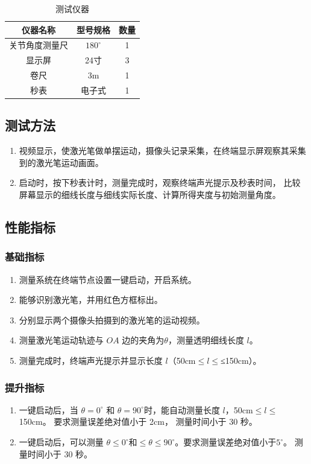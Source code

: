 \documentclass[scheme=chinese,a4paper]{article}
\begin{document}
\begin{table}[H]
  \centering
  \caption{测试仪器}
    \begin{tabular}{ccc}
    \toprule
    \multirow{1}[2]{*}{仪器名称} & \multirow{1}[2]{*}{型号规格} & \multirow{1}[2]{*}{数量}\\
  
    \midrule
    关节角度测量尺    &  $180^\circ$  & 1\\
    \midrule
    显示屏   &   24寸    & 3\\
    \midrule
    卷尺    &  3m  & 1   \\
    \midrule
    秒表    &  电子式  & 1   \\
    \bottomrule
    \end{tabular}%
\end{table}%
\subsection{测试方法}
\begin{enumerate}
  \item 视频显示，使激光笔做单摆运动，摄像头记录采集，在终端显示屏观察其采集到的激光笔运动画面。
  \item 启动时，按下秒表计时，测量完成时，观察终端声光提示及秒表时间，
  比较屏幕显示的细线长度与细线实际长度、计算所得夹度与初始测量角度。
\end{enumerate}

\subsection{性能指标}
\subsubsection{基础指标}
\begin{enumerate}
  \item 测量系统在终端节点设置一键启动，开启系统。
  \item 能够识别激光笔，并用红色方框标出。
  \item 分别显示两个摄像头拍摄到的激光笔的运动视频。
  \item 测量激光笔运动轨迹与 $OA$ 边的夹角为$\theta$，测量透明细线长度 $l$。
  \item 测量完成时，终端声光提示并显示长度 $l$（50cm$\leq l \leq$≤150cm）。
\end{enumerate}
\subsubsection{提升指标}
\begin{enumerate}
  \item 一键启动后，当 $\theta=0^{\circ}$ 和 $\theta=90^{\circ}$时，能自动测量长度 $l$，50cm$\leq l\leq$150cm。
要求测量误差绝对值小于 2cm， 测量时间小于 30 秒。
  \item 一键启动后，可以测量 $\theta \leq 0^\circ$和$\leq \theta \leq 90^\circ$。要求测量误差绝对值小于$5^\circ$。 测量时间小于 30 秒。
\end{enumerate}
\end{document}
